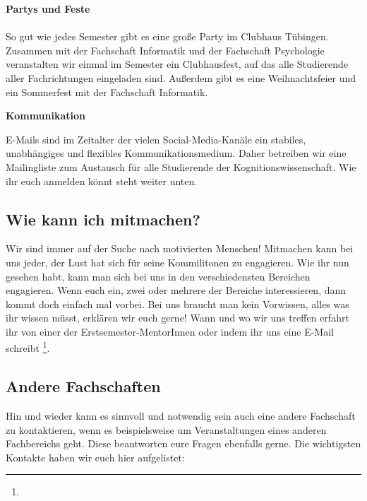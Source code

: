 \pagebreak

\textbf{Partys und Feste}
\\ \corona \\
So gut wie jedes Semester gibt es eine große Party im Clubhaus Tübingen. Zusammen mit der Fachschaft Informatik und der Fachschaft Psychologie veranstalten wir einmal im Semester ein Clubhausfest, auf das alle Studierende aller Fachrichtungen eingeladen sind. Außerdem gibt es eine Weihnachtsfeier und ein Sommerfest mit der Fachschaft Informatik.

\textbf{Kommunikation}

E-Mails sind im Zeitalter der vielen Social-Media-Kanäle ein stabiles, unabhängiges und flexibles Kommunikationsmedium. Daher betreiben wir eine Mailingliste zum Austausch für alle Studierende der Kognitionswissenschaft. Wie ihr euch anmelden könnt steht weiter unten. \\

\subsection{Wie kann ich mitmachen?}
Wir sind immer auf der Suche nach motivierten Menschen! Mitmachen kann bei uns jeder, der Lust hat sich für seine Kommilitonen zu engagieren. Wie ihr nun gesehen habt, kann man sich bei uns in den verschiedensten Bereichen engagieren. Wenn euch ein, zwei oder mehrere der Bereiche interessieren, dann kommt doch einfach mal vorbei. Bei uns braucht man kein Vorwissen, alles was ihr wissen müsst, erklären wir euch gerne!
Wann und wo wir uns treffen erfahrt ihr von einer der Erstsemester-MentorInnen oder indem ihr uns eine E-Mail schreibt \footnote{}.

\vfill
\subsection{Andere Fachschaften}
Hin und wieder kann es sinnvoll und notwendig sein auch eine andere Fachschaft zu kontaktieren, wenn es beispielsweise um Veranstaltungen eines anderen Fachbereichs geht. Diese beantworten eure Fragen ebenfalls gerne. Die wichtigsten Kontakte haben wir euch hier aufgelistet:

